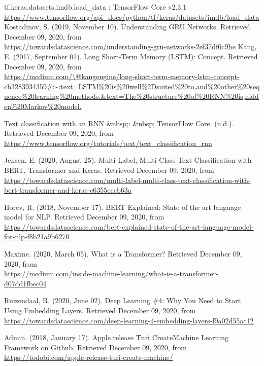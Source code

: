 \documentclass[12pt]{article}
\begin{document}
\medskip
\begin{thebibliography}{12} 
    tf.keras.datasets.imdb.load\_data : TensorFlow Core v2.3.1
    \\\url{https://www.tensorflow.org/api\_docs/python/tf/keras/datasets/imdb/load\_data}
    Kostadinov, S. (2019, November 10). Understanding GRU Networks. Retrieved December 09, 2020, from
    \\\url{https://towardsdatascience.com/understanding-gru-networks-2ef37df6c9be}
    Kang, E. (2017, September 01). Long Short-Term Memory (LSTM): Concept. Retrieved December 09, 2020, from 
    \\\url{https://medium.com/\@kangeugine/long-short-term-memory-lstm-concept-cb3283934359\#:~:text=LSTM\%20is\%20well\%2Dsuited\%20to,and\%20other\%20sequence\%20learning\%20methods.\&text=The\%20structure\%20of\%20RNN\%20is,hidden\%20Markov\%20model.}
    
    Text classification with an RNN \&nbsp;: \&nbsp; TensorFlow Core. (n.d.). Retrieved December 09, 2020, from
    \\\url{https://www.tensorflow.org/tutorials/text/text\_classification\_rnn}

    Jensen, E. (2020, August 25). Multi-Label, Multi-Class Text Classification with BERT, Transformer and Keras. Retrieved December 09, 2020, from
    \\\url{https://towardsdatascience.com/multi-label-multi-class-text-classification-with-bert-transformer-and-keras-c6355eccb63a}

    Horev, R. (2018, November 17). BERT Explained: State of the art language model for NLP. Retrieved December 09, 2020, from
    \\\url{https://towardsdatascience.com/bert-explained-state-of-the-art-language-model-for-nlp-f8b21a9b6270}

    Maxime. (2020, March 05). What is a Transformer? Retrieved December 09, 2020, from
    \\\url{https://medium.com/inside-machine-learning/what-is-a-transformer-d07dd1fbec04}

    Ruizendaal, R. (2020, June 02). Deep Learning \#4: Why You Need to Start Using Embedding Layers. Retrieved December 09, 2020, from
    \\\url{https://towardsdatascience.com/deep-learning-4-embedding-layers-f9a02d55ac12}

    Admin. (2018, January 17). Apple release \'Turi Create\' Machine Learning Framework on Github. Retrieved December 09, 2020, from
    \\\url{https://todobi.com/apple-release-turi-create-machine/}

    \end{thebibliography}
\end{document}
